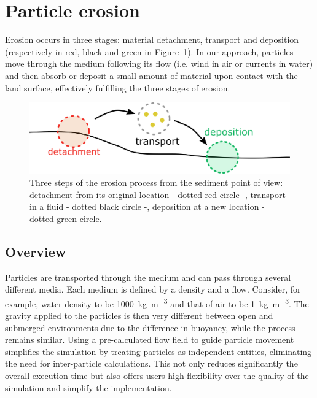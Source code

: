 \section{Particle erosion}%
\label{sec:erosion_method}
Erosion occurs in three stages: material detachment, transport and deposition (respectively in red, black and green in Figure~\ref{fig:erosion_ablation_erosion}). In our approach, particles move through the medium following its flow (i.e. wind in air or currents in water) and then absorb or deposit a small amount of material upon contact with the land surface, effectively fulfilling the three stages of erosion.
\begin{figure}[ht]
\centering
\includegraphics[width=0.95\linewidth]{figures/ablation_erosion.pdf}
\caption{Three steps of the erosion process from the sediment point of view: detachment from its original location - dotted red circle -, transport in a fluid - dotted black circle -, deposition at a new location - dotted green circle.}
\label{fig:erosion_ablation_erosion}

\end{figure}
\subsection{Overview}
Particles are transported through the medium and can pass through several different media. Each medium is defined by a density and a flow. Consider, for example, water density to be \SI{1000}{\kilogram \per \cubic \meter} and that of air to be \SI{1}{\kilogram \per \cubic \meter}. The gravity applied to the particles is then very different between open and submerged environments due to the difference in buoyancy, while the process remains similar.
Using a pre-calculated flow field to guide particle movement simplifies the simulation by treating particles as independent entities, eliminating the need for inter-particle calculations. This not only reduces significantly the overall execution time but also offers users high flexibility over the quality of the simulation and simplify the implementation. 
